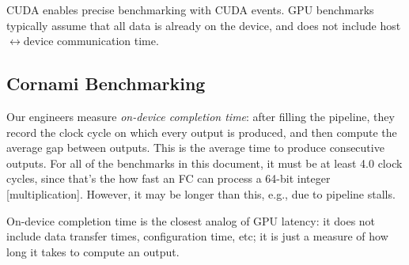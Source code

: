 \documentclass{article}
\begin{document}
	CUDA enables precise benchmarking with CUDA events. GPU benchmarks typically assume that all data is already on the device, and does not include host$\leftrightarrow$device communication time.	
	
	\subsection{Cornami Benchmarking}
	\label{sec:cornami-bench}
	Our engineers measure \emph{on-device completion time}: after filling the pipeline, they record the clock cycle on which every output is produced, and then compute the average gap between outputs. This is the average time to produce consecutive outputs. For all of the benchmarks in this document, it must be at least 4.0 clock cycles, since that's the how fast an FC can process a 64-bit integer [multiplication]. However, it may be longer than this, e.g., due to pipeline stalls.
	
	On-device completion time is the closest analog of GPU latency: it does not include data transfer times, configuration time, etc; it is just a measure of how long it takes to compute an output.
	
\end{document}
